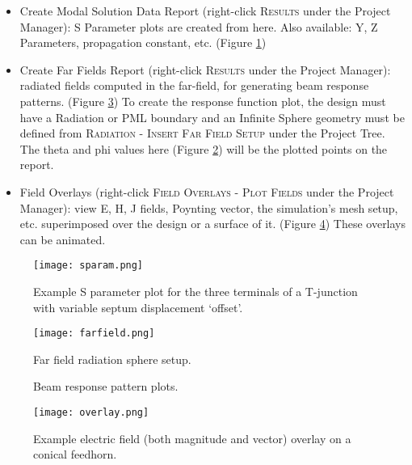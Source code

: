 \documentclass[11pt]{article}
\begin{document}
\begin{itemize}

	\item Create Modal Solution Data Report (right-click \textsc{Results} under the Project Manager): S Parameter plots are created from here. Also available: Y, Z Parameters, propagation constant, etc. (Figure \ref{fig:sparam})

	\item Create Far Fields Report (right-click \textsc{Results} under the Project Manager): radiated fields computed in the far-field, for generating beam response patterns. (Figure \ref{fig:beam}) To create the response function plot, the design must have a Radiation or PML boundary and an Infinite Sphere geometry must be defined from \textsc{Radiation - Insert Far Field Setup} under the Project Tree. The theta and phi values here (Figure \ref{fig:farfield}) will be the plotted points on the report.

	\item Field Overlays (right-click \textsc{Field Overlays - Plot Fields} under the Project Manager): view E, H, J fields, Poynting vector, the simulation's mesh setup, etc. superimposed over the design or a surface of it. (Figure \ref{fig:overlay}) These overlays can be animated.

\end{itemize}

\begin{figure}[H]
	\centering
	\texttt{[image: sparam.png]}
	\caption{Example S parameter plot for the three terminals of a T-junction with variable septum displacement `offset'.}
	\label{fig:sparam}
\end{figure}

\begin{figure}[H]
	\centering
	\texttt{[image: farfield.png]}
	\caption{Far field radiation sphere setup.}
	\label{fig:farfield}
\end{figure}

\begin{figure}[H]
	\centering
	\caption{Beam response pattern plots.}
	\label{fig:beam}
\end{figure}

\begin{figure}[H]
	\centering
	\texttt{[image: overlay.png]}
	\caption{Example electric field (both magnitude and vector) overlay on a conical feedhorn.}
	\label{fig:overlay}
\end{figure}
\end{document}
